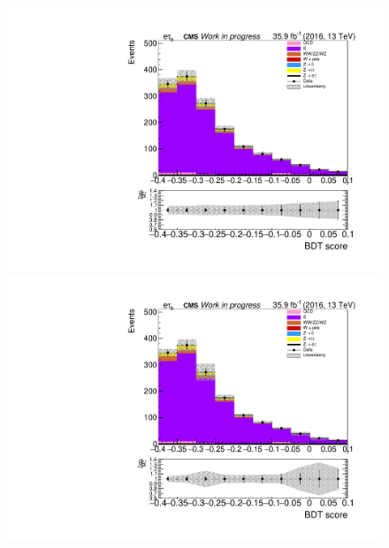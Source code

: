 \begin{figure}[htp]
	\begin{multicols}{2}
		\includegraphics[width=\linewidth]{plots/et/TT_CR_prefit.pdf}\par 
		\includegraphics[width=\linewidth]{plots/et/TT_CR_postfit.pdf}\par
	\end{multicols}	


\end{figure}
